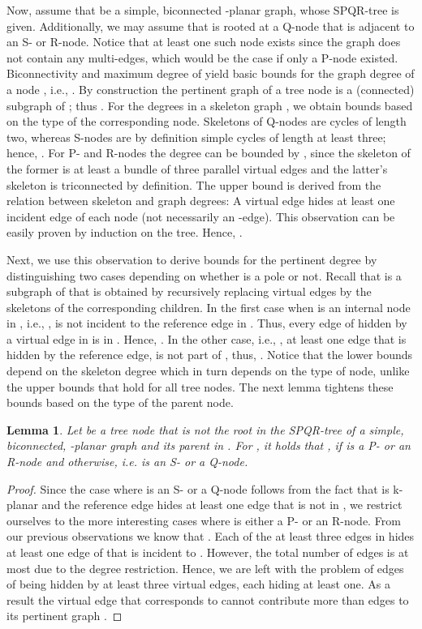 \documentclass[a4paper,twoside,11pt]{article}
\newtheorem{lemma}{Lemma}
\begin{document}
Now, assume that  be a simple, biconnected -planar graph,
whose SPQR-tree  is given. Additionally, we may assume
that  is rooted at a Q-node that is adjacent to an S-
or R-node. Notice that at least one such node exists since the graph
does not contain any multi-edges, which would be the case if only a
P-node existed. Biconnectivity and maximum degree of  yield basic
bounds for the graph degree of a node , i.e., . By construction the pertinent graph of a tree node
 is a (connected) subgraph of ; thus . For the degrees in a skeleton graph , we
obtain bounds based on the type of the corresponding node. Skeletons
of Q-nodes are cycles of length two, whereas S-nodes are by
definition simple cycles of length at least three; hence,
. For P- and R-nodes the degree can be bounded by
, since the skeleton of the former is
at least a bundle of three parallel virtual edges and the latter's
skeleton is triconnected by definition. The upper bound is derived
from the relation between skeleton and graph degrees: A virtual edge
 hides at least one incident edge of each node (not
necessarily an -edge). This observation can be easily proven
by induction on the tree. Hence, .

Next, we use this observation to derive bounds for the pertinent
degree by distinguishing two cases depending on whether  is a
pole or not. Recall that  is a subgraph of  that is
obtained by recursively replacing virtual edges by the skeletons of
the corresponding children. In the first case when  is an
internal node in , i.e., ,  is
not incident to the reference edge in . Thus, every edge
of  hidden by a virtual edge in  is in .
Hence, . In the other case,
i.e., , at least one edge that is hidden by
the reference edge, is not part of , thus,
. Notice that the
lower bounds depend on the skeleton degree which in turn depends on
the type of node, unlike the upper bounds that hold for all tree
nodes. The next lemma tightens these bounds based on the type of the
parent node.

\begin{lemma}
Let  be a tree node that is not the root in the SPQR-tree
 of a simple, biconnected, -planar graph  and
 its parent in . For , it
holds that , if  is a P- or an R-node
and  otherwise, i.e.  is an S- or a
Q-node. \label{lem:pdeg_bounds}
\end{lemma}
\begin{proof}
Since the case where  is an S- or a Q-node follows from the
fact that  is k-planar and the reference edge hides at least
one edge that is not in , we restrict ourselves to the
more interesting cases where  is either a P- or an R-node.
From our previous observations we know that . Each of the at least three edges in  hides at
least one edge of  that is incident to . However, the total
number of edges is at most  due to the degree restriction. Hence,
we are left with the problem of  edges of  being hidden by at
least three virtual edges, each hiding at least one. As a result the
virtual edge that corresponds to  cannot contribute more than
 edges to its pertinent graph .
\end{proof}
\end{document}

